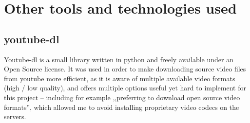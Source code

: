 \section{Other tools and technologies used}
\label{sec:other tools}

\subsection{youtube-dl}
Youtube-dl is a small library written in python and freely available under an Open Source license. 
It was used in order to make downloading source video files from youtube more efficient, as it is aware of multiple available video formats (high / low quality), and offers multiple options useful yet hard to implement for this project -- including for example ,,preferring to download open source video formats'', which allowed me to avoid installing proprietary video codecs on the servers.

%
%
